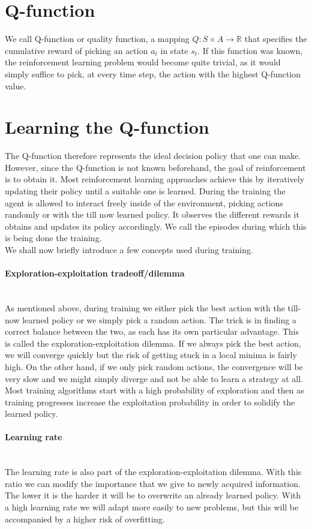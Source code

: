  \section{Q-function}
 We call Q-function or quality function, a mapping $Q:S \times A \rightarrow \mathbb{R}$ that specifies the cumulative reward of picking an action $a_t$ in state $s_t$. If this function was known, the reinforcement learning problem would become quite trivial, as it would simply suffice to pick, at every time step, the action with the highest Q-function value.
 
 \section{Learning the Q-function} 
The Q-function therefore represents the ideal decision policy that one can make. However, since the Q-function is not known beforehand, the goal of reinforcement is to obtain it. Most reinforcement learning approaches achieve this by iteratively updating their policy until a suitable one is learned. During the training the agent is allowed to interact freely inside of the environment, picking actions randomly or with the till now learned policy. It observes the different rewards it obtains and updates its policy accordingly. We call the episodes during which this is being done the training.\\ 
We shall now briefly introduce a few concepts used during training.
\paragraph{Exploration-exploitation tradeoff/dilemma} \mbox{}\\
As mentioned above, during training we either pick the best action with the till-now learned policy or we simply pick a random action. The trick is in finding a correct balance between the two, as each has its own particular advantage. This is called the exploration-exploitation dilemma\cite{yogeswaran2012reinforcement}. If we always pick the best action, we will converge quickly but the risk of getting stuck in a local minima is fairly high. On the other hand, if we only pick random actions, the convergence will be very slow and we might simply diverge and not be able to learn a strategy at all. Most training algorithms start with a high probability of exploration and then as training progresses increase the exploitation probability in order to solidify the learned policy.
\paragraph{Learning rate}\mbox{}\\
The learning rate is also part of the exploration-exploitation dilemma. With this ratio we can modify the importance that we give to newly acquired information. The lower it is the harder it will be to overwrite an already learned policy. With a high learning rate we will adapt more easily to new problems, but this will be accompanied by a higher risk of overfitting.

